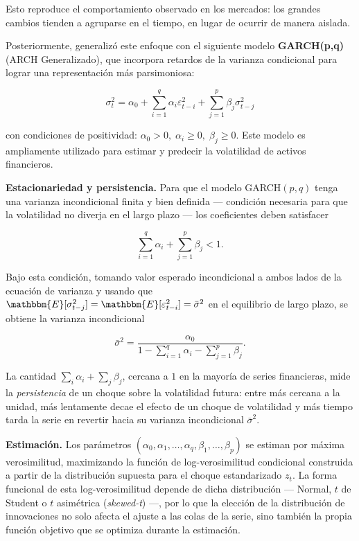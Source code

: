 \documentclass[12pt]{paper}
\begin{document}
Esto reproduce el comportamiento observado en los mercados: los grandes cambios tienden a agruparse en el tiempo, en lugar de ocurrir de manera aislada.

Posteriormente, \cite{bollerslev1986garch} generalizó este enfoque con el siguiente modelo \textbf{GARCH(p,q)} (ARCH Generalizado), que incorpora retardos de la varianza condicional para lograr una representación más parsimoniosa:

\begin{equation}
\sigma_t^2 = \alpha_0 + \sum_{i=1}^{q} \alpha_i \varepsilon_{t-i}^2
+ \sum_{j=1}^{p} \beta_j \sigma_{t-j}^2
\end{equation}

con condiciones de positividad: \(\alpha_0 > 0, \; \alpha_i \geq 0, \; \beta_j \geq 0\). Este modelo es ampliamente utilizado para estimar y predecir la volatilidad de activos financieros.

\vspace{0.3cm}

\noindent\textbf{Estacionariedad y persistencia.}
Para que el modelo GARCH$(p,q)$ tenga una varianza incondicional finita y bien definida --- condición necesaria para que la volatilidad no diverja en el largo plazo --- los coeficientes deben satisfacer

\begin{equation}
    \sum_{i=1}^{q} \alpha_i + \sum_{j=1}^{p} \beta_j < 1.
\end{equation}

Bajo esta condición, tomando valor esperado incondicional a ambos lados de la ecuación de varianza y usando que $\mathbbm{E}[\sigma_{t-j}^2] = \mathbbm{E}[\varepsilon_{t-i}^2] = \bar\sigma^2$ en el equilibrio de largo plazo, se obtiene la varianza incondicional

\begin{equation}
    \bar\sigma^2 = \frac{\alpha_0}{1 - \sum_{i=1}^{q}\alpha_i - \sum_{j=1}^{p}\beta_j}.
\end{equation}

La cantidad $\sum_i \alpha_i + \sum_j \beta_j$, cercana a $1$ en la mayoría de series financieras, mide la \emph{persistencia} de un choque sobre la volatilidad futura: entre más cercana a la unidad, más lentamente decae el efecto de un choque de volatilidad y más tiempo tarda la serie en revertir hacia su varianza incondicional $\bar\sigma^2$.

\noindent\textbf{Estimación.}
Los parámetros $(\alpha_0, \alpha_1,\ldots,\alpha_q,\beta_1,\ldots,\beta_p)$ se estiman por máxima verosimilitud, maximizando la función de log-verosimilitud condicional construida a partir de la distribución supuesta para el choque estandarizado $z_t$. La forma funcional de esta log-verosimilitud depende de dicha distribución --- Normal, $t$ de Student o $t$ asimétrica (\textit{skewed-t}) ---, por lo que la elección de la distribución de innovaciones no solo afecta el ajuste a las colas de la serie, sino también la propia función objetivo que se optimiza durante la estimación.
\end{document}
